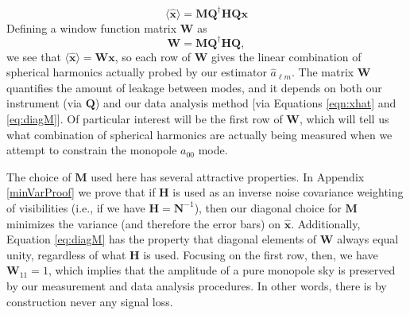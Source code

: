 \documentclass[twocolumn,apj,numberedappendix]{emulateapj}
\newcommand{\x}{\mathbf{x}}
\newcommand{\xhat}{\hat{\mathbf{x}}}
\newcommand{\y}{\mathbf{y}}
\newcommand{\N}{\mathbf{N}}
\newcommand{\Hmat}{\mathbf{H}}
\newcommand{\Q}{\mathbf{Q}}
\newcommand{\M}{\mathbf{M}}
\newcommand{\W}{\mathbf{W}}
\newcommand{\acl}[1]{{\color{red} \textbf{[ACL:  #1]}}}
\newcommand{\mep}[1]{{\color{applegreen} \textbf{[MEP:  #1]}}}
\begin{document}
%
%
\begin{equation}
\langle \xhat \rangle = \M \Q^\dagger \Hmat \Q \x
\end{equation}
Defining a window function matrix $\W$ as 
\begin{equation}
\W = \M \Q^\dagger \Hmat \Q,
\label{eq:Wform}
\end{equation}
we see that $\langle \xhat \rangle  = \W \mathbf{x}$, so each row of $\W$ gives the linear combination of spherical harmonics actually probed by our estimator $\hat{a}_{\ell m}$. The matrix $\W$ quantifies the amount of leakage between modes, and it depends on both our instrument (via $\Q$) and our data analysis method [via Equations \eqref{eqn:xhat} and \eqref{eq:diagM}]. Of particular interest will be the first row of $\W$, which will tell us what combination of spherical harmonics are actually being measured when we attempt to constrain the monopole $a_{00}$ mode.

The choice of $\M$ used here has several attractive properties. In Appendix \ref{minVarProof} we prove that if $\Hmat$ is used as an inverse noise covariance weighting of visibilities (i.e., if we have $\Hmat = \N^{-1}$), then our diagonal choice for $\M$ minimizes the variance (and therefore the error bars) on $\mathbf{\hat{x}}$. Additionally, Equation \eqref{eq:diagM} has the property that diagonal elements of $\W$ always equal unity, regardless of what $\Hmat$ is used. Focusing on the first row, then, we have $\W_{11} =1$, which implies that the amplitude of a pure monopole sky is preserved by our measurement and data analysis procedures. In other words, there is by construction never any signal loss.
%
%
\end{document}
